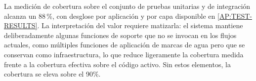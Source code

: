 La medición de cobertura sobre el conjunto de pruebas unitarias y de
integración alcanza un 88\,\%, con desglose por aplicación y por capa
disponible en \cref{AP:TEST-RESULTS}. La interpretación del valor
requiere matizarla: el sistema mantiene deliberadamente algunas
funciones de soporte que no se invocan en los flujos actuales, como
múltiples funciones de aplicación de marcas de agua pero que
se conservan como infraestructura, lo que
reduce ligeramente la cobertura medida frente a la cobertura efectiva
sobre el código activo. Sin estos elementos, la cobertura se eleva sobre
el 90\%.
